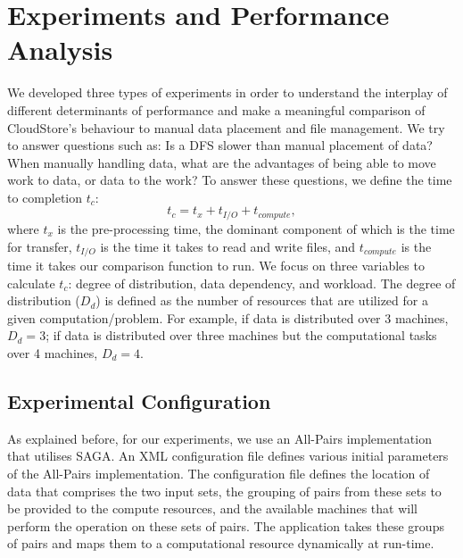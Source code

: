 \documentclass{rspublic}
\begin{document}
\section{Experiments and Performance Analysis} 
We developed three types of experiments in order to understand the
interplay of different determinants of performance and make a meaningful
comparison of CloudStore's behaviour to manual data placement and file
management. We try to answer questions such as: Is a DFS slower than
manual placement of data? When manually handling data, what are the
advantages of being able to move work to data, or data to the work? To
answer these questions, we define the time to completion $t_c$:
 \begin{equation}
t_c = t_x + t_{I/O} + t_{compute},
\end{equation}
where $t_x$ is the pre-processing time, the dominant component of which is
the time for transfer, $t_{I/O}$ is the time it takes to read and write
files, and $t_{compute}$ is the time it takes our comparison function to
run. We focus on three variables to calculate $t_c$: degree of
distribution, data dependency, and workload. The degree of distribution
($D_d$) is defined as the number of resources that are utilized for a
given computation/problem. For example, if data is distributed over 3
machines, $D_d=3$; if data is distributed over three machines but the
computational tasks over 4 machines, $D_d=4$.

\vspace{-0.3cm}

\subsection{Experimental Configuration}

As explained before, for our experiments, we use an All-Pairs
implementation that utilises SAGA. An XML configuration file defines
various initial parameters of the All-Pairs
implementation. The configuration file defines the location of data that
comprises the two input sets, the grouping of pairs from these sets to
be provided to the compute resources, and the available machines that
will perform the operation on these sets of pairs. The application takes
these groups of pairs and maps them to a computational resource
dynamically at run-time.
\end{document}
